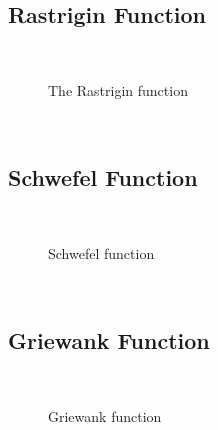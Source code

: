 \subsection{Rastrigin Function}
~
\begin{figure}[ht]
	\centering
	\setlength \fboxsep{0pt}
	\setlength \fboxrule{0.5pt}
	\caption{The Rastrigin function}
	\label{fig:RastriginGraph}
\end{figure}
~
\subsection{Schwefel Function}
~
\begin{figure}[ht]
	\centering
	\setlength \fboxsep{0pt}
	\setlength \fboxrule{0.5pt}
	\caption{Schwefel function}
	\label{fig:SchwefelGraph}
\end{figure}
~
\subsection{Griewank Function}
~
\begin{figure}[ht]
	\centering
	\setlength \fboxsep{0pt}
	\setlength \fboxrule{0.5pt}
	\caption{Griewank function}
	\label{fig:GriewankGraph}
\end{figure}
~
